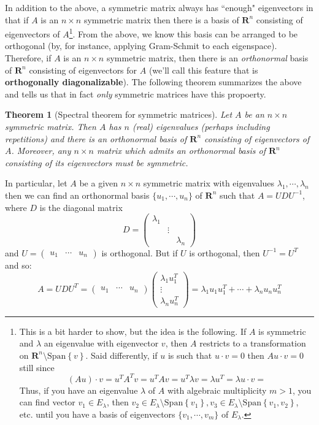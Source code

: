 \documentclass[12pt]{article}
\numberwithin{equation}{subsection}
\numberwithin{figure}{subsection}
\newtheorem{thm}[subsection]{Theorem}
\theoremstyle{note}
\newcommand{\R}{\mathbf{R}}
\newcommand\Span[1]{\mathrm{Span}\left\{#1\right\}}
\newcommand\m[1]{\begin{pmatrix}#1\end{pmatrix}}
\begin{document}
In addition to the above, a symmetric matrix always has ``enough" eigenvectors in that if $A$ is an $n\times n$ symmetric matrix then there is a basis of $\R^n$ consisting of eigenvectors of $A$\footnote{This is a bit harder to show, but the idea is the following. If $A$ is symmetric and $\lambda$ an eigenvalue with eigenvector $v$, then $A$ restricts to a transformation on $\R^n \setminus\Span{v}$. Said differently, if $u$ is such that $u\cdot v=0$ then $Au\cdot v=0$ still since \[ (Au)\cdot v=u^TA^Tv=u^TAv=u^T\lambda v=\lambda u^T=\lambda u\cdot v=\] Thus, if you have an eigenvalue $\lambda$ of $A$ with algebraic multiplicity $m>1$, you can find vector $v_1 \in E_{\lambda}$, then $v_2\in E_{\lambda}\setminus \Span{v_1}, v_3\in E_{\lambda} \setminus \Span{v_1,v_2}$, etc. until you have a basis of eigenvectors $\{v_1,\cdots,v_m\}$ of $E_{\lambda}$.}. From the above, we know this basis can be arranged to be orthogonal (by, for instance, applying Gram-Schmit to each eigenspace). Therefore, if $A$ is an $n\times n$ symmetric matrix, then there is an \textit{orthonormal} basis of $\R^n$ consisting of eigenvectors for $A$ (we'll call this feature that is \textbf{orthogonally diagonalizable}). The following theorem summarizes the above and tells us that in fact \textit{only} symmetric matrices have this propoerty.

\begin{thm}[Spectral theorem for symmetric matrices] \label{thm-sym-matrix}
	Let $A$ be an $n\times n$ symmetric matrix. Then $A$ has $n$ (real) eigenvalues (perhaps including repetitions) and  there is an orthonormal basis of $\R^n$ consisting of eigenvectors of $A$. Moreover, any $n\times n$ matrix which admits an orthonormal basis of $\R^n$ consisting of its eigenvectors must be symmetric.
\end{thm}

In particular, let $A$ be a given $n\times n$ symmetric matrix with eigenvalues $\lambda_1,\cdots,\lambda_n$ then we can find an orthonormal basis $\{u_1,\cdots,u_n\}$ of $\R^n$ such that $A=UDU^{-1}$, where $D$ is the diagonal matrix \[ D=\m{\lambda_1 && \\ & \vdots & \\ && \lambda_n}\] and $U=\m{u_1 & \cdots & u_n}$ is orthogonal. But if $U$ is orthogonal, then $U^{-1}=U^T$ and so:  \begin{equation} \label{eq-spec0} A=UDU^T=\m{u_1 & \cdots & u_n} \m{\lambda_1 u_1^T \\  \vdots \\  \lambda_n u_n^T}=\lambda_1 u_1u_1^T + \cdots + \lambda_n u_nu_n^T\end{equation}
\end{document}
